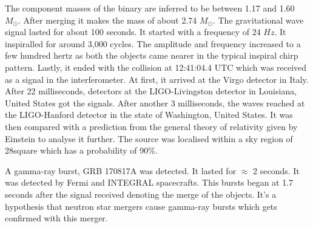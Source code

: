 The component masses of the binary are inferred to be between 1.17 and 1.60 $M_\odot$. After merging it makes the mass of about 2.74 $M_\odot$. The gravitational wave signal lasted for about 100 seconds. It started with a frequency of 24 $Hz$. It  inspiralled for around 3,000 cycles. The amplitude and frequency increased to a few hundred hertz as both the objects came nearer in the typical inspiral chirp pattern. Lastly, it ended with the collision at 12:41:04.4 UTC which was received as a signal in the interferometer. At first, it arrived at the Virgo detector in Italy. After 22 milliseconds, detectors at the LIGO-Livingston detector in Louisiana, United States got the signals. After another 3 milliseconds, the waves reached at the LIGO-Hanford detector in the state of Washington, United States. It was then compared with a prediction from the general theory of relativity given by Einstein to analyse it further. The source was localised within a sky region of 28\degree square which has a probability of 90\%.

A gamma-ray burst, GRB 170817A was detected. It lasted for $\approx$ 2 seconds. It was detected by Fermi and INTEGRAL spacecrafts. This bursts began at 1.7 seconds after the signal received denoting the merge of the objects. It's a hypothesis that neutron star mergers cause gamma-ray bursts which gets confirmed with this merger.

